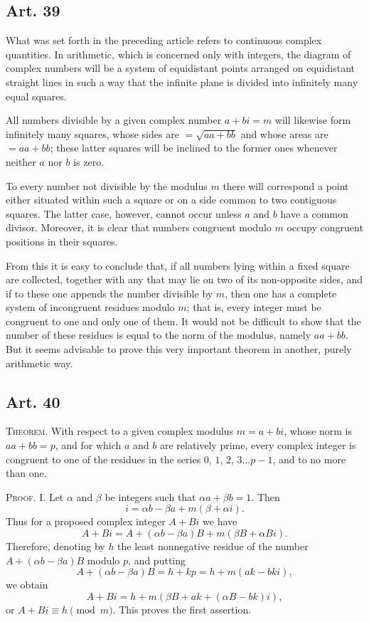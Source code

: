 \documentclass[12pt]{article}
\newcommand{\art}[1]{\subsection*{Art. #1}}
\begin{document}
\art{39}

What was set forth in the preceding article refers to continuous complex quantities. In arithmetic, which is concerned only with integers, the diagram of complex numbers will be a system of equidistant points arranged on equidistant straight lines in such a way that the infinite plane is divided into infinitely many equal squares.

All numbers divisible by a given complex number $a+bi=m$ will likewise form infinitely many squares, whose sides are $=\sqrt{aa+bb}$ and whose areas are $=aa+bb$; these latter squares will be inclined to the former ones whenever neither $a$ nor $b$ is zero.

To every number not divisible by the modulus $m$ there will correspond a point either situated within such a square or on a side common to two contiguous squares. The latter case, however, cannot occur unless $a$ and $b$ have a common divisor. Moreover, it is clear that numbers congruent modulo $m$ occupy congruent positions in their squares.

From this it is easy to conclude that, if all numbers lying within a fixed square are collected, together with any that may lie on two of its non-opposite sides, and if to these one appends the number divisible by $m$, then one has a complete system of incongruent residues modulo $m$; that is, every integer must be congruent to one and only one of them. It would not be difficult to show that the number of these residues is equal to the norm of the modulus, namely $aa+bb$. But it seems advisable to prove this very important theorem in another, purely arithmetic way.

\art{40}

\noindent\textsc{Theorem.} With respect to a given complex modulus $m=a+bi$, whose norm is $aa+bb=p$, and for which $a$ and $b$ are relatively prime, every complex integer is congruent to one of the residues in the series $0$, $1$, $2$, $3\ldots p-1$, and to no more than one.

\medskip
\noindent\textsc{Proof.} I. Let $\alpha$ and $\beta$ be integers such that $\alpha a+\beta b=1$. Then
\[
i=\alpha b-\beta a+m(\beta+\alpha i).
\]
Thus for a proposed complex integer $A+Bi$ we have
\[
A+Bi=A+(\alpha b-\beta a)B+m(\beta B+\alpha B i).
\]
Therefore, denoting by $h$ the least nonnegative residue of the number $A+(\alpha b-\beta a)B$ modulo $p$, and putting
\[
A+(\alpha b-\beta a)B=h+kp=h+m(ak-bki),
\]
we obtain
\[
A+Bi=h+m(\beta B+ak+(\alpha B-bk)i),
\]
or $A+Bi\equiv h \pmod{m}$. This proves the first assertion.
\end{document}
